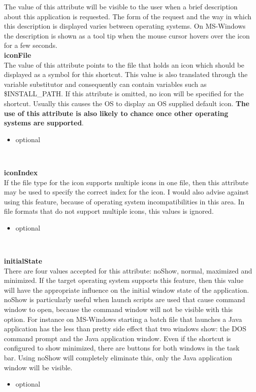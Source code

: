 The value of this attribute will be visible to the user when a brief
description about this application is requested. The form of the
request and the way in which this description is displayed varies
between operating systems. On MS-Windows the description is shown as a
tool tip when the mouse cursor hovers over the icon for a few seconds.\\

\textbf{iconFile}\\

The value of this attribute points to the file that holds an icon which
should be displayed as a symbol for this shortcut. This value is also
translated through the variable substitutor and consequently can contain
variables such as \$INSTALL\_PATH. If this attribute is omitted, no icon
will be specified for the shortcut. Usually this causes the OS to
display an OS supplied default icon. \textbf{The use of this attribute is also
likely to chance once other operating systems are supported}.\\
\begin{itemize}
\item optional
\end{itemize}\

\textbf{iconIndex}\\

If the file type for the icon supports multiple icons in one file, then
this attribute may be used to specify the correct index for the icon. I
would also advise against using this feature, because of operating
system incompatibilities in this area. In file formats that do not
support multiple icons, this values is ignored.\\
\begin{itemize}
\item optional
\end{itemize}\

\textbf{initialState}\\

There are four values accepted for this attribute: noShow, normal,
maximized and minimized. If the target operating system supports this
feature, then this value will have the appropriate influence on the
initial window state of the application. noShow is particularly useful
when launch scripts are used that cause command window to open, because
the command window will not be visible with this option. For instance on
MS-Windows starting a batch file that launches a Java application has
the less than pretty side effect that two windows show: the DOS command
prompt and the Java application window. Even if the shortcut is
configured to show minimized, there are buttons for both windows in the
task bar. Using noShow will completely eliminate this, only the Java
application window will be visible.\\
\begin{itemize}
\item optional
\end{itemize}\

